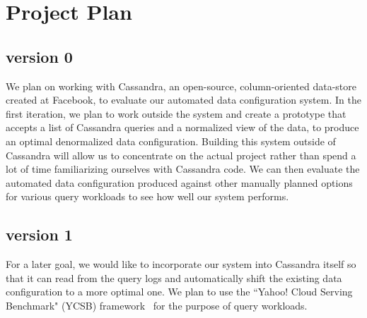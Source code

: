 \documentclass[10pt]{article}
\begin{document}
\section{Project Plan}
\subsection*{version 0}
We plan on working with Cassandra, an open-source, column-oriented data-store created at Facebook, to evaluate our automated data configuration
system. In the first iteration, we plan to work outside the system and create a prototype that accepts a list of Cassandra queries and a normalized
view of the data, to produce an optimal denormalized data configuration. Building this system outside of Cassandra will allow us to concentrate on 
the actual project rather than spend a lot of time familiarizing ourselves with Cassandra code. We can then evaluate the automated data configuration 
produced against other manually planned options for various query workloads to see how well our system performs.

\subsection*{version 1}
For a later goal, we would like to incorporate our system into Cassandra itself so that it can read from the query logs and automatically shift 
the existing data configuration to a more optimal one. We plan to use the ``Yahoo! Cloud Serving Benchmark" (YCSB) framework~\cite{ycsb} for the
purpose of query workloads.



\end{document}
